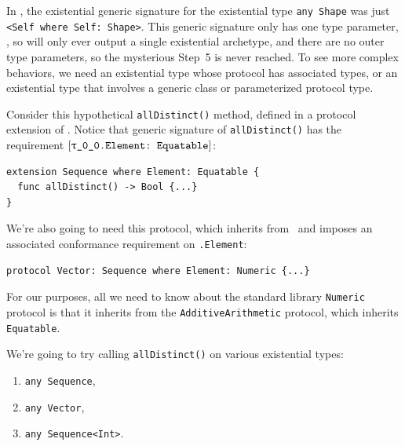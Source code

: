 \documentclass[../generics]{subfiles}
\begin{document}
In , the existential generic signature for the existential type \texttt{any Shape} was just \verb|<Self where Self: Shape>|. This generic signature only has one type parameter, \tSelf, so  will only ever output a single existential archetype, and there are no outer type parameters, so the mysterious Step~5 is never reached. To see more complex behaviors, we need an existential type whose protocol has associated types, or an existential type that involves a generic class or parameterized protocol type.

\begin{example}
Consider this hypothetical \texttt{allDistinct()} method, defined in a protocol extension of \tSequence. Notice that generic signature of \texttt{allDistinct()} has the requirement $\ConfReq{\rT.Element}{Equatable}$:
\begin{Verbatim}
extension Sequence where Element: Equatable {
  func allDistinct() -> Bool {...}
}
\end{Verbatim}
We're also going to need this protocol, which inherits from \tSequence\ and imposes an associated conformance requirement on \texttt{\rT.Element}:
\begin{Verbatim}
protocol Vector: Sequence where Element: Numeric {...}
\end{Verbatim}
For our purposes, all we need to know about the standard library \texttt{Numeric} protocol is that it inherits from the \texttt{AdditiveArithmetic} protocol, which inherits \texttt{Equatable}.

We're going to try calling \texttt{allDistinct()} on various existential types:
\begin{enumerate}
\item \texttt{any~Sequence},
\item \texttt{any~Vector},
\item \texttt{any~Sequence<Int>}.
\end{enumerate}


\end{example}
\end{document}
